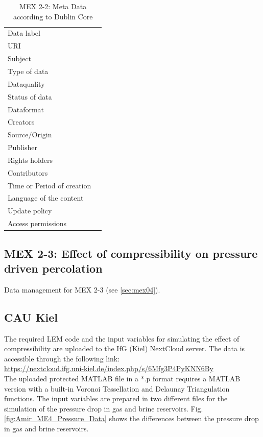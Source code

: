 \begin{table}[!ht]
\caption{MEX 2-2: Meta Data according to Dublin Core}
\label{tab:dms-mex2-2}
\small
\begin{tabular}{R{3cm}|L{7cm}}
\hline
%
Data label &  \\
URI &  \\
Subject  &  \\
Type of data  &  \\
Dataquality  &  \\
Status of data  &  \\
Dataformat  & \\
Creators  &  \\
Source/Origin &  \\
Publisher  &  \\
Rights holders &  \\
Contributors &  \\
Time or Period of creation &  \\
Language of the content &  \\
Update policy &  \\
Access permissions &  \\
%
\hline
\end{tabular}
\end{table}

\subsection{MEX 2-3: Effect of compressibility on pressure driven percolation}

Data management for MEX 2-3 (see \ref{sec:mex04}).

\subsection*{CAU Kiel}

The required LEM code and the input variables for simulating the effect of compressibility are uploaded to the IfG (Kiel) NextCloud server. The data is accessible through the following link:\\
\hyperlink{https://nextcloud.ifg.uni-kiel.de/index.php/s/6Mfg3P4PyKNN6By}{https://nextcloud.ifg.uni-kiel.de/index.php/s/6Mfg3P4PyKNN6By}\\

The uploaded protected MATLAB file in a *.p format requires a MATLAB version with a built-in Voronoi Tessellation and Delaunay Triangulation functions. The input variables are prepared in two different files for the simulation of the pressure drop in gas and brine reservoirs. Fig. \ref{fig:Amir_ME4_Pressure_Data} shows the differences between the pressure drop in gas and brine reservoirs.

